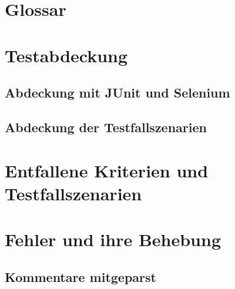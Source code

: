 \documentclass[parskip=full,11pt,twoside]{scrartcl}
\begin{document}
    \section{Glossar}


    \section{Testabdeckung}
    \subsection{Abdeckung mit JUnit und Selenium}

    \subsection{Abdeckung der Testfallszenarien}

    \section{Entfallene Kriterien und Testfallszenarien}

    \section{Fehler und ihre Behebung}
    \subsection{Kommentare mitgeparst}
\end{document}
